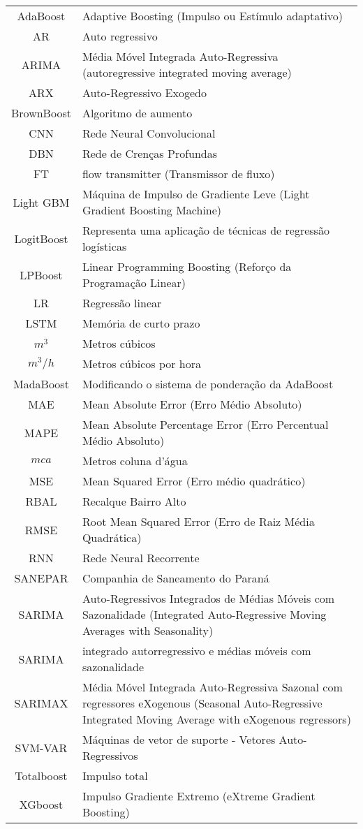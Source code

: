 \begin{tabular}{cp{}}
AdaBoost & Adaptive Boosting (Impulso ou Estímulo adaptativo)\\
AR & Auto regressivo\\
ARIMA & Média Móvel Integrada Auto-Regressiva (autoregressive integrated moving average) \\
ARX & Auto-Regressivo Exogedo\\ 
BrownBoost & Algoritmo de aumento\\
CNN & Rede Neural Convolucional\\
DBN & Rede de Crenças Profundas \\
FT & flow transmitter (Transmissor de fluxo)\\
Light GBM & Máquina de Impulso de Gradiente Leve (Light Gradient Boosting Machine) \\
LogitBoost & Representa uma aplicação de técnicas de regressão logísticas\\
LPBoost & Linear Programming Boosting (Reforço da Programação Linear)\\
LR & Regressão linear\\
LSTM & Memória de curto prazo\\
$ m^3 $ & Metros cúbicos\\
$ m^3/h $ & Metros cúbicos por hora\\
MadaBoost & Modificando o sistema de ponderação da AdaBoost\\
MAE & Mean Absolute Error (Erro Médio Absoluto)\\
MAPE &  Mean Absolute Percentage Error (Erro Percentual Médio Absoluto)\\
$ mca $ & Metros coluna d’água\\
MSE & Mean Squared Error (Erro médio quadrático)\\
RBAL & Recalque Bairro Alto\\
RMSE & Root Mean Squared Error (Erro de Raiz Média Quadrática)\\
RNN & Rede Neural Recorrente\\
SANEPAR & Companhia de Saneamento do Paraná \\
SARIMA & Auto-Regressivos Integrados de Médias Móveis com Sazonalidade (Integrated Auto-Regressive Moving Averages with Seasonality) \\
SARIMA & integrado autorregressivo e médias móveis com sazonalidade\\
SARIMAX &  Média Móvel Integrada Auto-Regressiva Sazonal com regressores eXogenous (Seasonal Auto-Regressive Integrated Moving Average with eXogenous regressors) \\
SVM-VAR & Máquinas de vetor de suporte - Vetores Auto-Regressivos\\
Totalboost & Impulso total\\
XGboost & Impulso Gradiente Extremo (eXtreme Gradient Boosting) 
\end{tabular}




